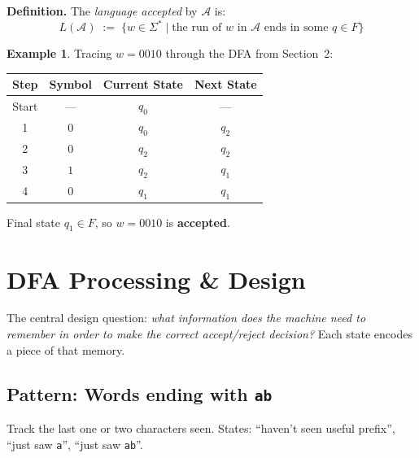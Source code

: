 \documentclass[11pt, a4paper]{article}
\theoremstyle{definition}
\newtheorem{example}{Example}[section]
\theoremstyle{remark}
\newcommand{\dfa}{\mathcal{A}}
\begin{document}
\begin{defbox}
\textbf{Definition.}  The \emph{language accepted} by $\dfa$ is:
\[
  L(\dfa)\;:=\;
  \bigl\{w\in\Sigma^*\;\big|\;
  \text{the run of }w\text{ in }\dfa\text{ ends in some }q\in F\bigr\}
\]
\end{defbox}

\begin{example}
Tracing $w=0010$ through the DFA from Section~2:

\begin{center}
\begin{tabular}{cccc}
  \toprule
  Step & Symbol & Current State & Next State \\
  \midrule
  Start & --- & $q_0$ & --- \\
  1 & $0$ & $q_0$ & $q_2$ \\
  2 & $0$ & $q_2$ & $q_2$ \\
  3 & $1$ & $q_2$ & $q_1$ \\
  4 & $0$ & $q_1$ & $q_1$ \\
  \bottomrule
\end{tabular}
\end{center}

Final state $q_1\in F$, so $w=0010$ is \textbf{accepted}.
\end{example}

\section{DFA Processing \& Design}

The central design question: \emph{what information does the machine need to remember in
order to make the correct accept/reject decision?}  Each state encodes a piece of that memory.

\subsection{Pattern: Words ending with \texttt{ab}}

Track the last one or two characters seen.  States: ``haven't seen useful prefix'',
``just saw \texttt{a}'', ``just saw \texttt{ab}''.
\end{document}

